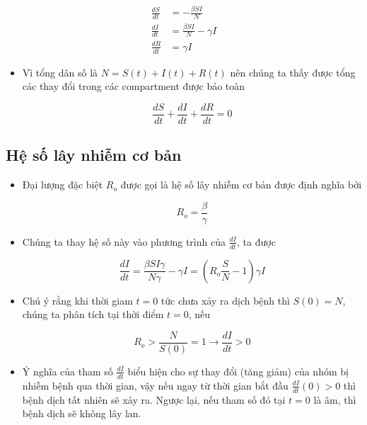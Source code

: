 \documentclass[11pt]{article}
\providecommand{\tightlist}{%
      \setlength{\itemsep}{0pt}\setlength{\parskip}{0pt}}
\begin{document}
\begin{align}
\frac{dS}{dt} &= -\frac{\beta SI}{N} \\
\frac{dI}{dt} &= \frac{\beta SI}{N} - \gamma I\\
\frac{dR}{dt} &= \gamma I
\end{align}

\begin{itemize}
\tightlist
\item
  Vì tổng dân số là \(N = S(t) + I(t) + R(t)\) nên chúng ta thấy được
  tổng các thay đổi trong các compartment được bảo toàn

  \begin{equation}
  \frac{dS}{dt}+\frac{dI}{dt}+\frac{dR}{dt} = 0
  \end{equation}
\end{itemize}

\subsection{Hệ số lây nhiễm cơ
bản}\label{huxea-suxf4-luxe2y-nhiuxeam-cux1a1-ban}

\begin{itemize}
\tightlist
\item
  Đại lượng đặc biệt \(R_o\) được gọi là hệ số lây nhiễm cơ bản được
  định nghĩa bởi

  \begin{equation}
  R_o = \frac{\beta}{\gamma}
  \end{equation}
\item
  Chúng ta thay hệ số này vào phương trình của \(\frac{dI}{dt}\), ta
  được

  \begin{equation}
  \frac{dI}{dt} = \frac{\beta SI \gamma}{N \gamma} - \gamma I = (R_o \frac{S}{N}-1)\gamma I
  \end{equation}
\item
  Chú ý rằng khi thời giam \(t=0\) tức chưa xảy ra dịch bệnh thì
  \(S(0) = N\), chúng ta phân tích tại thời điểm \(t=0\), nếu

  \begin{equation}
  R_o > \frac{N}{S(0)} = 1 \longrightarrow \frac{dI}{dt} > 0
  \end{equation}
\item
  Ý nghĩa của tham số \(\frac{dI}{dt}\) biểu hiện cho sự thay đổi (tăng
  giảm) của nhóm bị nhiễm bệnh qua thời gian, vậy nếu ngay từ thời gian
  bắt đầu \(\frac{dI}{dt}(0)>0\) thì bệnh dịch tất nhiên sẽ xảy ra.
  Ngược lại, nếu tham số đó tại \(t = 0\) là âm, thì bệnh dịch sẽ không
  lây lan.
\end{itemize}
\end{document}
